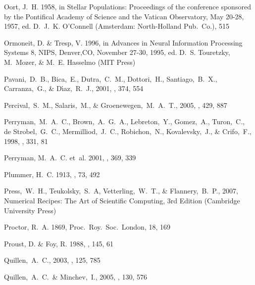 \begin{thebibliography}{99}
{Oort}, J.~H. 1958, in {Stellar Populations: Proceedings of the conference
  sponsored by the Pontifical Academy of Science and the Vatican Observatory,
  May 20-28, 1957}, ed. D.~J.~K. {O'Connell} ({Amsterdam}: {North-Holland
  Pub.~Co.}), 515

{Ormoneit}, D. \& {Tresp}, V. 1996, in {Advances in Neural Information
  Processing Systems 8, NIPS, Denver,CO, November 27-30, 1995}, ed. D.~S.
  {Touretzky}, M.~{Mozer}, \& M.~E. {Hasselmo} (MIT Press)

  Pavani,~D.~B., Bica,~E., Dutra,~C.~M., Dottori,~H., Santiago,~B.~X., Carranza,~G., \& D{\'{\i}}az,~R.~J., 2001,
  \aap, 374, 554

  Percival,~S.~M., Salaris,~M., \& Groenewegen,~M.~A.~T., 2005,
  \aap, 429, 887

  Perryman,~M.~A.~C., Brown,~A.~G.~A., Lebreton,~Y., Gomez,~A., Turon,~C., de Strobel,~G.~C., Mermilliod,~J.~C., Robichon,~N., Kovalevsky,~J., \& Crifo,~F., 1998,
  \aap, 331, 81

{Perryman}, M.~A.~C. {et~al.} 2001, \aap, 369, 339

{Plummer}, H.~C. 1913, \mnras, 73, 492

  Press,~W.~H., Teukolsky,~S.~A, Vetterling,~W.~T., \& Flannery,~B.~P., 2007,
  Numerical Recipes: The Art of Scientific Computing, 3rd Edition (Cambridge University Press)

{Proctor}, R.~A. 1869, Proc.~Roy.~Soc.~London, 18, 169

{Proust}, D. \& {Foy}, R. 1988, \apss, 145, 61

  Quillen,~A.~C., 2003, 
  \aj, 125, 785

  Quillen,~A.~C.~\& Minchev,~I., 2005,
  \aj, 130, 576


\end{thebibliography}
